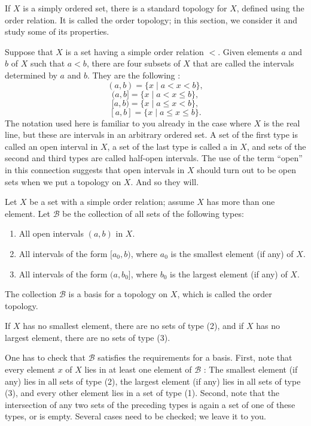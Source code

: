 
If \(X\) is a simply ordered set, there is a standard topology for \(X\), defined using the order relation. It is called the order topology; in this section, we consider it and study some of its properties.

Suppose that \(X\) is a set having a simple order relation \(<\). Given elements \(a\) and \(b\) of \(X\) such that \(a < b\), there are four subsets of \(X\) that are called the intervals determined by \(a\) and \(b\). They are the following :
\[
( {a,b}) = \{ x \mid a < x < b\},
\]
\[
( {a,b}\rbrack  = \{ x \mid a < x \leq b\},
\]
\[
\lbrack a,b) = \{ x \mid a \leq x < b\},
\]
\[
[ {a,b}] = \{ x \mid a \leq x \leq b\}.
\]
The notation used here is familiar to you already in the case where \(X\) is the real line, but these are intervals in an arbitrary ordered set. A set of the first type is called an open interval in \(X\), a set of the last type is called a  in \(X\), and sets of the second and third types are called half-open intervals. The use of the term ``open'' in this connection suggests that open intervals in \(X\) should turn out to be open sets when we put a topology on \(X\). And so they will.

\begin{definition}
 Let \(X\) be a set with a simple order relation; assume \(X\) has more than one element. Let \(\mathcal{B}\) be the collection of all sets of the following types:

 \begin{enumerate}[itemsep=0.2em, parsep=0pt, topsep=0pt, partopsep=0pt, leftmargin=*, label=(\arabic*), align=left]
 \item All open intervals \((a, b)\) in \(X\).
 \item All intervals of the form \([ {a_{0},b})\), where \(a_{0}\) is the smallest element (if any) of \(X\).
 \item All intervals of the form \(( {a,b_{0}}]\), where \(b_{0}\) is the largest element (if any) of \(X\).
 \end{enumerate}
 The collection \(\mathcal{B}\) is a basis for a topology on \(X\), which is called the order topology.
\end{definition}

If \(X\) has no smallest element, there are no sets of type (2), and if \(X\) has no largest element, there are no sets of type (3).

One has to check that \(\mathcal{B}\) satisfies the requirements for a basis. First, note that every element \(x\) of \(X\) lies in at least one element of \(\mathcal{B}\) : The smallest element (if any) lies in all sets of type (2), the largest element (if any) lies in all sets of type (3), and every other element lies in a set of type (1). Second, note that the intersection of any two sets of the preceding types is again a set of one of these types, or is empty. Several cases need to be checked; we leave it to you.


